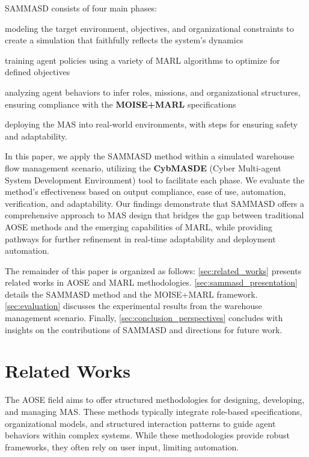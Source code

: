 \documentclass[sigconf,anonymous]{aamas}
\begin{document}
SAMMASD consists of four main phases:
\begin{enumerate*}[label=\roman*,itemjoin={; \quad}]
  \item modeling the target environment, objectives, and organizational constraints to create a simulation that faithfully reflects the system's dynamics
  \item training agent policies using a variety of MARL algorithms to optimize for defined objectives
  \item analyzing agent behaviors to infer roles, missions, and organizational structures, ensuring compliance with the \textbf{MOISE+MARL} specifications
  \item deploying the MAS into real-world environments, with steps for ensuring safety and adaptability.
\end{enumerate*}

In this paper, we apply the SAMMASD method within a simulated warehouse flow management scenario, utilizing the \textbf{CybMASDE} (Cyber Multi-agent System Development Environment) tool to facilitate each phase. We evaluate the method's effectiveness based on output compliance, ease of use, automation, verification, and adaptability. Our findings demonstrate that SAMMASD offers a comprehensive approach to MAS design that bridges the gap between traditional AOSE methods and the emerging capabilities of MARL, while providing pathways for further refinement in real-time adaptability and deployment automation.

The remainder of this paper is organized as follows: \autoref{sec:related_works} presents related works in AOSE and MARL methodologies. \autoref{sec:sammasd_presentation} details the SAMMASD method and the MOISE+MARL framework. \autoref{sec:evaluation} discusses the experimental results from the warehouse management scenario. Finally, \autoref{sec:conclusion_perspectives} concludes with insights on the contributions of SAMMASD and directions for future work.

\section{Related Works}
\label{sec:related_works}

The AOSE field aims to offer structured methodologies for designing, developing, and managing MAS. These methods typically integrate role-based specifications, organizational models, and structured interaction patterns to guide agent behaviors within complex systems. While these methodologies provide robust frameworks, they often rely on user input, limiting automation.
\end{document}
